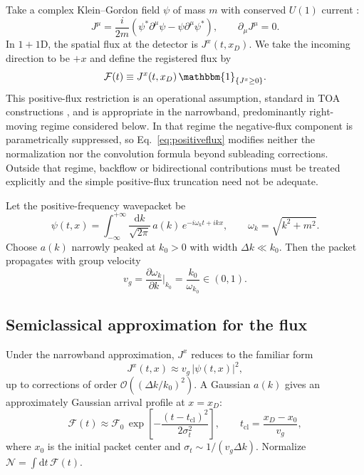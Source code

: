 \documentclass[pdflatex,sn-mathphys-num]{sn-jnl}
\theoremstyle{thmstylethree}
\theoremstyle{thmstyleone}
\theoremstyle{thmstyletwo}
\numberwithin{equation}{section}
\newcommand{\dd}{\mathrm{d}}
\newcommand{\F}{\mathcal{F}}
\newcommand{\cO}{\mathcal{O}}
\begin{document}
        Take a complex Klein--Gordon field $\psi$ of mass $m$ with conserved $U(1)$ current \cite{Peskin1995,Weinberg1995}:
        \begin{equation}
            J^\mu = \frac{i}{2m}\left(\psi^\ast \partial^\mu \psi - \psi \partial^\mu \psi^\ast\right),
            \qquad \partial_\mu J^\mu = 0.
            \label{eq:KGcurrent}
        \end{equation}
        In $1+1$D, the spatial flux at the detector is $J^x(t,x_D)$. We take the incoming direction to be $+x$ and define the registered flux by
        \begin{equation}
            \F(t)\equiv J^x(t,x_D)\,\mathbbm{1}_{\{J^x\ge 0\}}.
            \label{eq:positiveflux}
        \end{equation}
        This positive-flux restriction is an operational assumption, standard in TOA constructions \cite{Kijowski1974,Giannitrapani1997,Muga2008}, and is appropriate in the narrowband, predominantly right-moving regime considered below. In that regime the negative-flux component is parametrically suppressed, so Eq.~\eqref{eq:positiveflux} modifies neither the normalization nor the convolution formula beyond subleading corrections. Outside that regime, backflow or bidirectional contributions must be treated explicitly and the simple positive-flux truncation need not be adequate.
        
        Let the positive-frequency wavepacket be
        \begin{equation}
            \psi(t,x)=\int_{-\infty}^{+\infty}\frac{\dd k}{\sqrt{2\pi}}\,
            a(k)\,e^{-i\omega_k t + i k x},
            \qquad \omega_k=\sqrt{k^2+m^2}.
            \label{eq:wavepacket}
        \end{equation}
        Choose $a(k)$ narrowly peaked at $k_0>0$ with width $\Delta k\ll k_0$. Then the packet propagates with group velocity
        \begin{equation}
            v_g=\frac{\partial \omega_k}{\partial k}\Big|_{k_0}=\frac{k_0}{\omega_{k_0}}\in(0,1).
        \end{equation}
    
    \subsection{Semiclassical approximation for the flux}
        
        Under the narrowband approximation, $J^x$ reduces to the familiar form
        \begin{equation}
            J^x(t,x)\approx v_g\,|\psi(t,x)|^2,
            \label{eq:Japprox}
        \end{equation}
        up to corrections of order $\cO((\Delta k/k_0)^2)$. A Gaussian $a(k)$ gives an approximately Gaussian arrival profile at $x=x_D$:
        \begin{equation}
            \F(t)\approx \F_0\,\exp\!\left[-\frac{(t-t_{\mathrm{cl}})^2}{2\sigma_t^2}\right],
            \qquad
            t_{\mathrm{cl}}=\frac{x_D-x_0}{v_g},
            \label{eq:fluxGaussian}
        \end{equation}
        where $x_0$ is the initial packet center and $\sigma_t\sim 1/(v_g\Delta k)$. Normalize $\mathcal{N}=\int \dd t\,\F(t)$.
    
\end{document}
